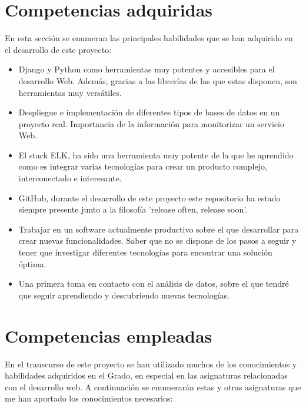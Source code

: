 \documentclass[11pt,a4paper]{book}
\begin{document}
		\section{Competencias adquiridas}
			En esta sección se enumeran las principales habilidades que se han adquirido en el desarrollo de este proyecto:
			\begin{itemize}
				\item Django y Python como herramientas muy potentes y accesibles para el desarrollo Web. Además, gracias a las librerías de las que estas disponen, son herramientas muy versátiles.\\
				
				\item Despliegue e implementación de diferentes tipos de bases de datos en un proyecto real. Importancia de la información para monitorizar un servicio Web.\\
				
				\item El stack ELK, ha sido una herramienta muy potente de la que he aprendido como es integrar varias tecnologías para crear un producto complejo, interconectado e interesante.\\
				
				\item GitHub, durante el desarrollo de este proyecto este repositorio ha estado siempre presente junto a la filosofía 'release often, release soon'.\\
				
				\item Trabajar en un software actualmente productivo sobre el que desarrollar para crear nuevas funcionalidades. Saber que no se dispone de los pasos a seguir y tener que investigar diferentes tecnologías para encontrar una solución óptima.\\
				 
				\item Una primera toma en contacto con el análisis de datos, sobre el que tendré que seguir aprendiendo y descubriendo nuevas tecnologías.\\
			\end{itemize}
			
		\section{Competencias empleadas}
			En el transcurso de este proyecto se han utilizado muchos de los conocimientos y habilidades adquiridos en el Grado, en especial en las asignaturas relacionadas con el desarrollo web. A continuación se enumerarán estas y otras asignaturas que me han aportado los conocimientos necesarios:
			
\end{document}

